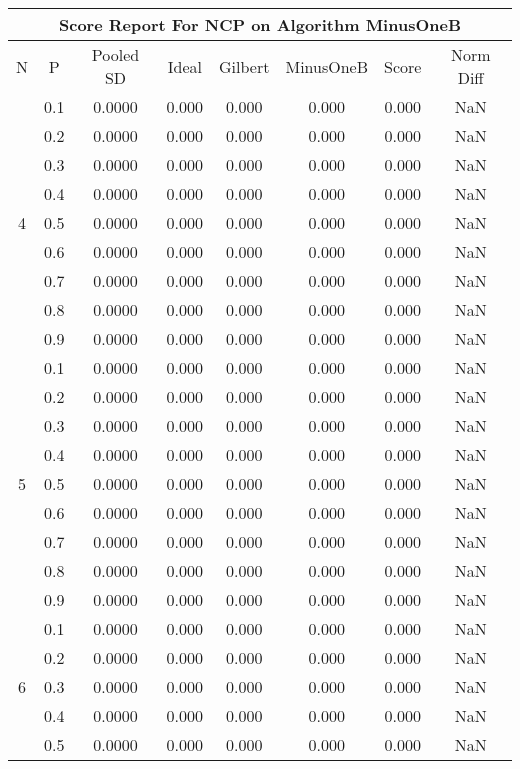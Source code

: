 \documentclass[11pt,a4paper]{report}
\begin{document}
\begin{longtable}{ | c | c || c | c | c | c | c | c | }
\hline
\multicolumn{8}{|c|}{ Score Report For NCP on Algorithm MinusOneB} \\
\hline
N & P & Pooled SD &  Ideal &  Gilbert & MinusOneB  & Score & Norm Diff \\
 \hline
 \hline
 \endhead
\multirow{9}{*}{4} & 0.1 & 0.0000 & 0.000 & 0.000 & 0.000 & 0.000 & NaN \\
 & 0.2 & 0.0000 & 0.000 & 0.000 & 0.000 & 0.000 & NaN \\
 & 0.3 & 0.0000 & 0.000 & 0.000 & 0.000 & 0.000 & NaN \\
 & 0.4 & 0.0000 & 0.000 & 0.000 & 0.000 & 0.000 & NaN \\
 & 0.5 & 0.0000 & 0.000 & 0.000 & 0.000 & 0.000 & NaN \\
 & 0.6 & 0.0000 & 0.000 & 0.000 & 0.000 & 0.000 & NaN \\
 & 0.7 & 0.0000 & 0.000 & 0.000 & 0.000 & 0.000 & NaN \\
 & 0.8 & 0.0000 & 0.000 & 0.000 & 0.000 & 0.000 & NaN \\
 & 0.9 & 0.0000 & 0.000 & 0.000 & 0.000 & 0.000 & NaN \\
 \hline
\multirow{9}{*}{5} & 0.1 & 0.0000 & 0.000 & 0.000 & 0.000 & 0.000 & NaN \\
 & 0.2 & 0.0000 & 0.000 & 0.000 & 0.000 & 0.000 & NaN \\
 & 0.3 & 0.0000 & 0.000 & 0.000 & 0.000 & 0.000 & NaN \\
 & 0.4 & 0.0000 & 0.000 & 0.000 & 0.000 & 0.000 & NaN \\
 & 0.5 & 0.0000 & 0.000 & 0.000 & 0.000 & 0.000 & NaN \\
 & 0.6 & 0.0000 & 0.000 & 0.000 & 0.000 & 0.000 & NaN \\
 & 0.7 & 0.0000 & 0.000 & 0.000 & 0.000 & 0.000 & NaN \\
 & 0.8 & 0.0000 & 0.000 & 0.000 & 0.000 & 0.000 & NaN \\
 & 0.9 & 0.0000 & 0.000 & 0.000 & 0.000 & 0.000 & NaN \\
 \hline
\multirow{9}{*}{6} & 0.1 & 0.0000 & 0.000 & 0.000 & 0.000 & 0.000 & NaN \\
 & 0.2 & 0.0000 & 0.000 & 0.000 & 0.000 & 0.000 & NaN \\
 & 0.3 & 0.0000 & 0.000 & 0.000 & 0.000 & 0.000 & NaN \\
 & 0.4 & 0.0000 & 0.000 & 0.000 & 0.000 & 0.000 & NaN \\
 & 0.5 & 0.0000 & 0.000 & 0.000 & 0.000 & 0.000 & NaN \\

\end{longtable}
\end{document}
